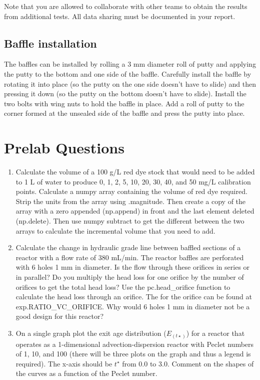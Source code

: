 \documentclass[letterpaper,10pt,english]{sphinxmanual}
\begin{document}
Note that you are allowed to collaborate with other teams to obtain the results from additional tests. All data sharing must be documented in your report.


\subsection{Baffle installation}
\label{\detokenize{Reactor_Characteristics/Reactor_Characteristics:baffle-installation}}
The baffles can be installed by rolling a 3 mm diameter roll of putty and applying the putty to the bottom and one side of the baffle. Carefully install the baffle by rotating it into place (so the putty on the one side doesn’t have to slide) and then pressing it down (so the putty on the bottom doesn’t have to slide). Install the two bolts with wing nuts to hold the baffle in place. Add a roll of putty to the corner formed at the unsealed side of the baffle and press the putty into place.


\section{Prelab Questions}
\label{\detokenize{Reactor_Characteristics/Reactor_Characteristics:prelab-questions}}\label{\detokenize{Reactor_Characteristics/Reactor_Characteristics:heading-reactor-pre-laboratory-questions}}\begin{enumerate}
\item {} 
Calculate the  volume of a 100 g/L red dye stock that would need to be added to 1 L of water to produce 0, 1, 2, 5, 10, 20, 30, 40, and 50 mg/L calibration points. Calculate a numpy array containing the  volume of red dye required. Strip the units from the array using .magnitude. Then create a copy of the array with a zero appended (np.append) in front and the last element deleted (np.delete). Then use numpy subtract to get the different between the two arrays to calculate the incremental volume that you need to add.

\item {} 
Calculate the change in hydraulic grade line between baffled sections of a reactor with a flow rate of 380 mL/min. The reactor baffles are perforated with 6 holes 1 mm in diameter. Is the flow through these orifices in series or in parallel? Do you multiply the head loss for one orifice by the number of orifices to get the total head loss? Use the pc.head\_orifice function to calculate the head loss through an orifice. The  for the orifice can be found at exp.RATIO\_VC\_ORIFICE. Why would 6 holes 1 mm in diameter not be a good design for this reactor?

\item {} 
On a single graph plot the exit age distribution (\(E_{(t\star)}\)) for a reactor that operates as a 1-dimensional advection-dispersion reactor with Peclet numbers of 1, 10, and 100 (there will be three plots on the graph and thus a legend is required). The x-axis should be \(t^\star\) from 0.0 to 3.0. Comment on the shapes of the curves as a function of the Peclet number.

\end{enumerate}
\end{document}
